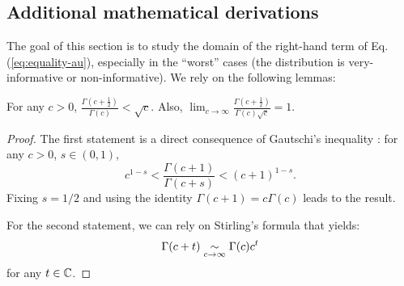     
    
    
    
    
    
    
    
    \subsection{Additional mathematical derivations}\label{app:additionalmaths}
    
        The goal of this section is to study the domain of the right-hand term of Eq. (\ref{eq:equality-au}), especially in the ``worst'' cases (the distribution is very-informative or non-informative).
        We rely on the following lemmas:
        \begin{lem}\label{lem:app-ineqG}
            For any $c>0$, $\displaystyle{\frac{\Gamma\left(c+\frac{1}{2}\right)}{\Gamma(c)}<\sqrt{c}}$. Also, $\displaystyle{
                \lim_{c\rightarrow\infty}\frac{\Gamma\left(c+\frac{1}{2}\right)}{\Gamma(c)\sqrt{c}}=1.
                }$
        \end{lem}
        \begin{proof}
            The first statement is a direct consequence of Gautschi's inequality \citep{gautschi_elementary_1959}: for any $c>0$, $s\in(0,1)$,
                \begin{equation}
                    c^{1-s}<\frac{\Gamma(c+1)}{\Gamma(c+s)}<(c+1)^{1-s}.
                \end{equation}
            Fixing $s=1/2$ and using the identity $\Gamma(c+1)=c\Gamma(c)$ leads to the result.
    
            For the second statement, we can rely on Stirling's formula \citep{davis_leonhard_1959} that yields:
                \begin{equation}
                    \Gamma(c+t) \underset{c\rightarrow\infty}{\sim} \Gamma(c)c^t
                \end{equation}
            for any $t\in\mathbb{C}$.
        \end{proof}
        
